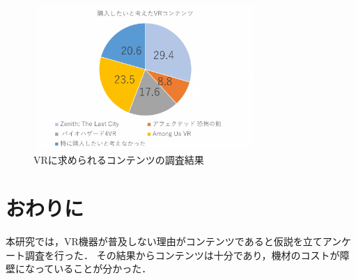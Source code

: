 \documentclass[twocolumn,10pt,a4j]{ltjsarticle}
\begin{document}
\begin{figure}[h]
\begin{center}
 \includegraphics[clip,width=85mm,height=55mm]{購入したいと考えたvrコンテンツ.pdf}
\end{center}
 \caption{VRに求められるコンテンツの調査結果}
 \label{fig:購入したいと考えたvrコンテンツ.pdf}
\end{figure}


\section{おわりに}
本研究では，VR機器が普及しない理由がコンテンツであると仮説を立てアンケート調査を行った．
その結果からコンテンツは十分であり，機材のコストが障壁になっていることが分かった．

\end{document}
